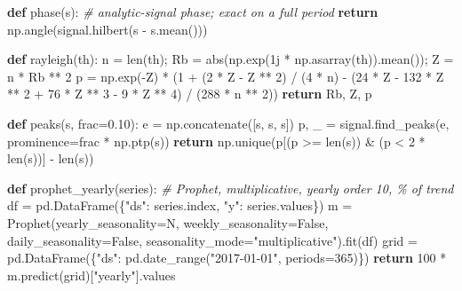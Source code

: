 \documentclass[
  10pt,
  a4paper,
]{article}
\newenvironment{Shaded}{}{}
\newcommand{\BuiltInTok}[1]{#1}
\newcommand{\CommentTok}[1]{\textit{#1}}
\newcommand{\ControlFlowTok}[1]{\textbf{#1}}
\newcommand{\DecValTok}[1]{#1}
\newcommand{\FloatTok}[1]{#1}
\newcommand{\KeywordTok}[1]{\textbf{#1}}
\newcommand{\NormalTok}[1]{#1}
\newcommand{\OperatorTok}[1]{#1}
\newcommand{\OtherTok}[1]{#1}
\newcommand{\StringTok}[1]{#1}
\newcommand{\VariableTok}[1]{#1}
\begin{document}
\begin{Shaded}
\begin{Highlighting}[]
\KeywordTok{def}\NormalTok{ phase(s):                     }\CommentTok{\# analytic{-}signal phase; exact on a full period}
    \ControlFlowTok{return}\NormalTok{ np.angle(signal.hilbert(s }\OperatorTok{{-}}\NormalTok{ s.mean()))}

\KeywordTok{def}\NormalTok{ rayleigh(th):}
\NormalTok{    n }\OperatorTok{=} \BuiltInTok{len}\NormalTok{(th)}\OperatorTok{;}\NormalTok{ Rb }\OperatorTok{=} \BuiltInTok{abs}\NormalTok{(np.exp(}\OtherTok{1j} \OperatorTok{*}\NormalTok{ np.asarray(th)).mean())}\OperatorTok{;}\NormalTok{ Z }\OperatorTok{=}\NormalTok{ n }\OperatorTok{*}\NormalTok{ Rb }\OperatorTok{**} \DecValTok{2}
\NormalTok{    p }\OperatorTok{=}\NormalTok{ np.exp(}\OperatorTok{{-}}\NormalTok{Z) }\OperatorTok{*}\NormalTok{ (}\DecValTok{1} \OperatorTok{+}\NormalTok{ (}\DecValTok{2} \OperatorTok{*}\NormalTok{ Z }\OperatorTok{{-}}\NormalTok{ Z }\OperatorTok{**} \DecValTok{2}\NormalTok{) }\OperatorTok{/}\NormalTok{ (}\DecValTok{4} \OperatorTok{*}\NormalTok{ n)}
                      \OperatorTok{{-}}\NormalTok{ (}\DecValTok{24} \OperatorTok{*}\NormalTok{ Z }\OperatorTok{{-}} \DecValTok{132} \OperatorTok{*}\NormalTok{ Z }\OperatorTok{**} \DecValTok{2} \OperatorTok{+} \DecValTok{76} \OperatorTok{*}\NormalTok{ Z }\OperatorTok{**} \DecValTok{3} \OperatorTok{{-}} \DecValTok{9} \OperatorTok{*}\NormalTok{ Z }\OperatorTok{**} \DecValTok{4}\NormalTok{) }\OperatorTok{/}\NormalTok{ (}\DecValTok{288} \OperatorTok{*}\NormalTok{ n }\OperatorTok{**} \DecValTok{2}\NormalTok{))}
    \ControlFlowTok{return}\NormalTok{ Rb, Z, p}

\KeywordTok{def}\NormalTok{ peaks(s, frac}\OperatorTok{=}\FloatTok{0.10}\NormalTok{):}
\NormalTok{    e }\OperatorTok{=}\NormalTok{ np.concatenate([s, s, s])}
\NormalTok{    p, \_ }\OperatorTok{=}\NormalTok{ signal.find\_peaks(e, prominence}\OperatorTok{=}\NormalTok{frac }\OperatorTok{*}\NormalTok{ np.ptp(s))}
    \ControlFlowTok{return}\NormalTok{ np.unique(p[(p }\OperatorTok{\textgreater{}=} \BuiltInTok{len}\NormalTok{(s)) }\OperatorTok{\&}\NormalTok{ (p }\OperatorTok{\textless{}} \DecValTok{2} \OperatorTok{*} \BuiltInTok{len}\NormalTok{(s))] }\OperatorTok{{-}} \BuiltInTok{len}\NormalTok{(s))}

\KeywordTok{def}\NormalTok{ prophet\_yearly(series):       }\CommentTok{\# Prophet, multiplicative, yearly order 10, \% of trend}
\NormalTok{    df }\OperatorTok{=}\NormalTok{ pd.DataFrame(\{}\StringTok{"ds"}\NormalTok{: series.index, }\StringTok{"y"}\NormalTok{: series.values\})}
\NormalTok{    m }\OperatorTok{=}\NormalTok{ Prophet(yearly\_seasonality}\OperatorTok{=}\NormalTok{N, weekly\_seasonality}\OperatorTok{=}\VariableTok{False}\NormalTok{,}
\NormalTok{                daily\_seasonality}\OperatorTok{=}\VariableTok{False}\NormalTok{, seasonality\_mode}\OperatorTok{=}\StringTok{"multiplicative"}\NormalTok{).fit(df)}
\NormalTok{    grid }\OperatorTok{=}\NormalTok{ pd.DataFrame(\{}\StringTok{"ds"}\NormalTok{: pd.date\_range(}\StringTok{"2017{-}01{-}01"}\NormalTok{, periods}\OperatorTok{=}\DecValTok{365}\NormalTok{)\})}
    \ControlFlowTok{return} \DecValTok{100} \OperatorTok{*}\NormalTok{ m.predict(grid)[}\StringTok{"yearly"}\NormalTok{].values}


\end{Highlighting}
\end{Shaded}
\end{document}
